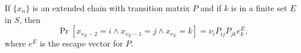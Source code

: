 If $\{x_n\}$ is an extended chain with transition matrix $P$ and if $k$ is in a finite set $E$ in $S$, then
$$\Pr[x_{v_E-2} = i \land x_{v_E-1} = j \land x_{v_E} = k] = \nu_i P_{ij} P_{jk} e_k^E,$$
where $e^E$ is the escape vector for $P$.
